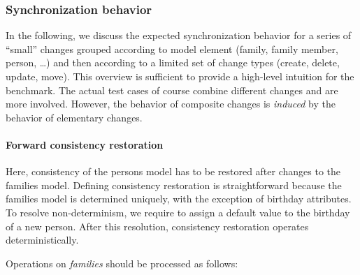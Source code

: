 
\subsubsection{Synchronization behavior}      

In the following, we discuss the expected synchronization behavior for a series of ``small'' changes grouped according to model element (family, family member, person, \ldots) and then according to a limited set of change types (create, delete, update, move).
This overview is sufficient to provide a high-level intuition for the benchmark.
The actual test cases of course combine different changes and are more involved. However, the behavior of composite changes is \emph{induced} by the behavior of elementary changes.

\paragraph{Forward consistency restoration}

Here, consistency of the persons model has to be restored after changes to the families model. Defining consistency restoration is straightforward because the families model is determined uniquely, with the exception of birthday attributes. To resolve non-determinism, we require to assign a default value to the birthday of a new person. After this resolution, consistency restoration operates deterministically.

Operations on \emph{families} should be processed as follows:

